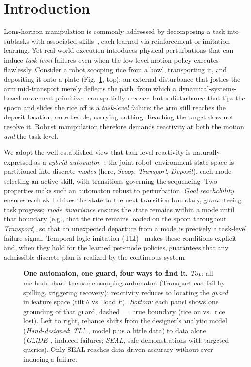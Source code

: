 \section{Introduction}
Long-horizon manipulation is commonly addressed by decomposing a task into subtasks with associated skills~\cite{konidaris2018skills,dalal2024manipgen,Ahn2022DoAI,merging_dmp}, each learned via reinforcement or imitation learning. Yet real-world execution introduces physical perturbations that can induce \emph{task-level} failures even when the low-level motion policy executes flawlessly. Consider a robot scooping rice from a bowl, transporting it, and depositing it onto a plate (Fig.~\ref{fig:seal_ltl_comp}, top): an external disturbance that jostles the arm mid-transport merely deflects the path, from which a dynamical-systems-based movement primitive~\cite{Ijspeert_NC_2013,figueroa2018lpvds,DSbook} can spatially recover; but a disturbance that tips the spoon and slides the rice off is a \emph{task-level} failure: the arm still reaches the deposit location, on schedule, carrying nothing. Reaching the target does not resolve it. Robust manipulation therefore demands reactivity at both the motion \emph{and} the task level.

We adopt the well-established view that task-level reactivity is naturally expressed as a \emph{hybrid automaton}~\cite{burridge1999sequential,kressgazit2009temporal}: the joint robot--environment state space is partitioned into discrete \emph{modes} (here, \textit{Scoop}, \textit{Transport}, \textit{Deposit}), each mode selecting an active skill, with transitions governing the sequencing. Two properties make such an automaton robust to perturbation. \emph{Goal reachability} ensures each skill drives the state to the next transition boundary, guaranteeing task progress; \emph{mode invariance} ensures the state remains within a mode until that boundary (e.g., that the rice remains loaded on the spoon throughout \textit{Transport}), so that an unexpected departure from a mode is precisely a task-level failure signal. Temporal-logic imitation (TLI)~\cite{wang2022temporal} makes these conditions explicit and, when they hold for the learned per-mode policies, guarantees that any admissible discrete plan is realized by the continuous system.

\begin{figure}[t!]
\centering

\vspace{-3mm}
\caption{\textbf{One automaton, one guard, four ways to find it.} \emph{Top:} all methods share the same scooping automaton (Transport can fail by spilling, triggering recovery); reactivity reduces to locating the \emph{guard} in feature space (tilt $\theta$ vs.\ load $F$). \emph{Bottom:} each panel shows one grounding of that guard, dashed $=$ true boundary (rice on vs.\ rice lost). Left to right, reliance shifts from the designer's analytic model (\emph{Hand-designed}; \emph{TLI}~\cite{wang2022temporal}, model plus a little data) to data alone (\emph{GLiDE}~\cite{wang2024grounding}, induced failures; \emph{SEAL}, safe demonstrations with targeted queries). Only SEAL reaches data-driven accuracy without ever inducing a failure.}
\label{fig:seal_ltl_comp}
\end{figure}

